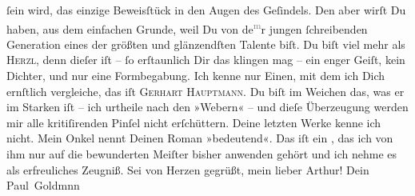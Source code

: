 \begin{ledgroupsized}[t]{13cm}
               ſein wird, das einzige Beweisſtück in den Augen des Geſindels. Den aber wirſt Du
               haben, aus dem einfachen Grunde, weil Du von de\substVorne{}\textsuperscript{\textcolor{gray}{m}}\substDazwischen{}r\substHinten{} jungen ſchreibenden {\pb}Generation eines der
               größten und glänzendſten Talente biſt. Du biſt viel mehr als \textsc{Herzl}, denn dieſer iſt – ſo erſtaunlich Dir das klingen mag – ein enger Geiſt, kein
               Dichter, und nur eine Formbegabung. Ich kenne nur Einen, mit dem ich Dich ernſtlich
               vergleiche, das iſt \textsc{Gerhart Hauptmann}. Du biſt im Weichen das, was er im Starken iſt – ich urtheile nach den »Webern« – und dieſe Überzeugung werden mir alle
               kritiſirenden Pinſel nicht erſchüttern. Deine letzten Werke kenne ich nicht. Mein Onkel nennt Deinen Roman »bedeutend«. Das iſt ein
                  \label{K_L02711-6v}\label{K_L02711-6h}, das ich von ihm nur auf die bewunderten Meiſter bisher anwenden
               gehört und ich nehme es als erfreuliches Zeugniß.\pend
           \pstart
           Sei von Herzen gegrüßt, mein lieber Arthur!\pend
           \pstart Dein \spacefill\mbox{Paul Goldmnn}\pend{}
         
         \endnumbering{}\end{ledgroupsized}  \newcommand{\dateiname}{L02711}\newcommand{\titel}{Paul Goldmann an Arthur Schnitzler, 8. 8. 1893}\newcommand{\editorInnen}{Martin Anton Müller und Laura Untner}
      